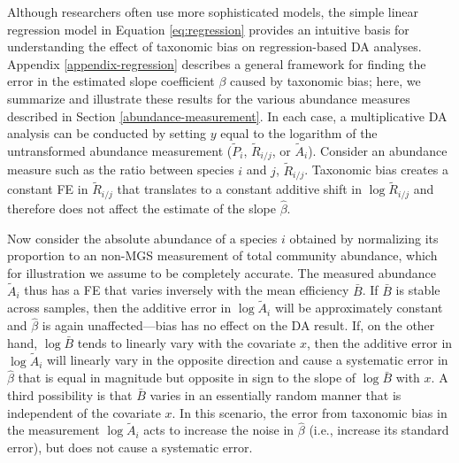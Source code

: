 \documentclass[
]{article}
\begin{document}
Although researchers often use more sophisticated models, the simple linear regression model in Equation \eqref{eq:regression} provides an intuitive basis for understanding the effect of taxonomic bias on regression-based DA analyses.
Appendix \ref{appendix-regression} describes a general framework for finding the error in the estimated slope coefficient \(\beta\) caused by taxonomic bias; here, we summarize and illustrate these results for the various abundance measures described in Section \ref{abundance-measurement}.
In each case, a multiplicative DA analysis can be conducted by setting \(y\) equal to the logarithm of the untransformed abundance measurement (\(\tilde P_i\), \(\tilde R_{i/j}\), or \(\tilde A_i\)).
Consider an abundance measure such as the ratio between species \(i\) and \(j\), \(\tilde R_{i/j}\).
Taxonomic bias creates a constant FE in \(\tilde R_{i/j}\) that translates to a constant additive shift in \(\log \tilde R_{i/j}\) and therefore does not affect the estimate of the slope \(\hat \beta\).

Now consider the absolute abundance of a species \(i\) obtained by normalizing its proportion to an non-MGS measurement of total community abundance, which for illustration we assume to be completely accurate.
The measured abundance \(\tilde A_i\) thus has a FE that varies inversely with the mean efficiency \(\bar B\).
If \(\bar B\) is stable across samples, then the additive error in \(\log \tilde A_i\) will be approximately constant and \(\hat \beta\) is again unaffected---bias has no effect on the DA result.
If, on the other hand, \(\log \bar B\) tends to linearly vary with the covariate \(x\), then the additive error in \(\log \tilde A_i\) will linearly vary in the opposite direction and cause a systematic error in \(\hat \beta\) that is equal in magnitude but opposite in sign to the slope of \(\log \bar B\) with \(x\).
A third possibility is that \(\bar B\) varies in an essentially random manner that is independent of the covariate \(x\).
In this scenario, the error from taxonomic bias in the measurement \(\log \tilde A_{i}\) acts to increase the noise in \(\hat \beta\) (i.e., increase its standard error), but does not cause a systematic error.
\end{document}
